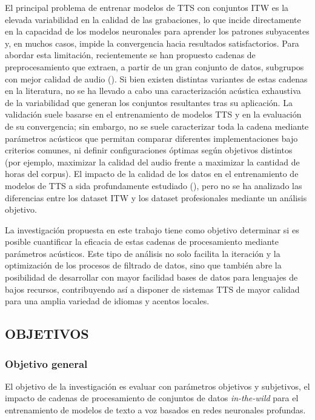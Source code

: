 El principal problema de entrenar modelos de TTS con conjuntos ITW es la elevada variabilidad en la calidad de las grabaciones, lo que incide directamente en la capacidad de los modelos neuronales para aprender los patrones subyacentes y, en muchos casos, impide la convergencia hacia resultados satisfactorios. Para abordar esta limitación, recientemente se han propuesto cadenas de preprocesamiento que extraen, a partir de un gran conjunto de datos, subgrupos con mejor calidad de audio (\cite{autoprep}). Si bien existen distintas variantes de estas cadenas en la literatura, no se ha llevado a cabo una caracterización acústica exhaustiva de la variabilidad que generan los conjuntos resultantes tras su aplicación. La validación suele basarse en el entrenamiento de modelos TTS y en la evaluación de su convergencia; sin embargo, no se suele caracterizar toda la cadena mediante parámetros acústicos que permitan comparar diferentes implementaciones bajo criterios comunes, ni definir configuraciones óptimas según objetivos distintos (por ejemplo, maximizar la calidad del audio frente a maximizar la cantidad de horas del corpus). El impacto de la calidad de los datos en el entrenamiento de modelos de TTS a sida profundamente estudiado (\cite{improv_tts2}), pero no se ha analizado las diferencias entre los dataset ITW y los dataset profesionales mediante un análisis objetivo.

La investigación propuesta en este trabajo tiene como objetivo determinar si es posible cuantificar la eficacia de estas cadenas de procesamiento mediante parámetros acústicos. Este tipo de análisis no solo facilita la iteración y la optimización de los procesos de filtrado de datos, sino que también abre la posibilidad de desarrollar con mayor facilidad bases de datos para lenguajes de bajos recursos, contribuyendo así a disponer de sistemas TTS de mayor calidad para una amplia variedad de idiomas y acentos locales.


\subsection{OBJETIVOS}

\subsubsection{Objetivo general}
El objetivo de la investigación es evaluar con parámetros objetivos y subjetivos, el impacto de cadenas de procesamiento de conjuntos de datos \emph{in-the-wild} para el entrenamiento de modelos de texto a voz basados en redes neuronales profundas.


